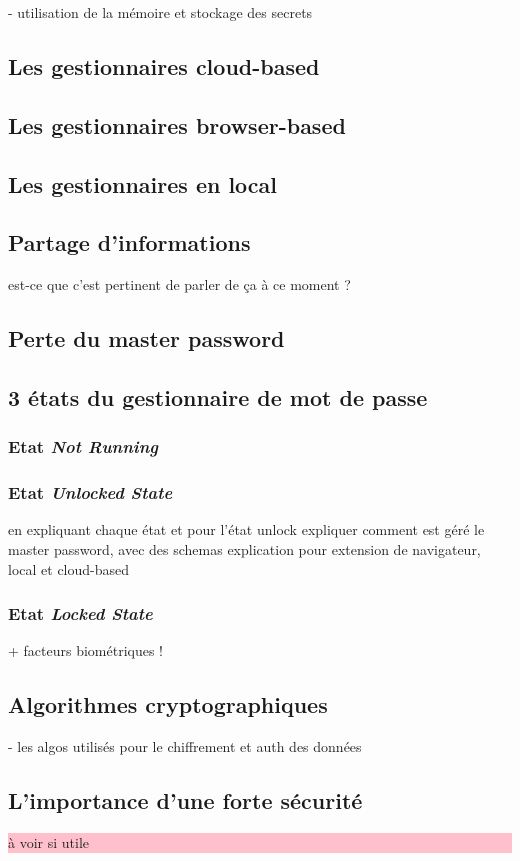 - utilisation de la mémoire et stockage des secrets
\subsection{Les gestionnaires cloud-based}
\subsection{Les gestionnaires browser-based}
\subsection{Les gestionnaires en local}
\subsection{Partage d'informations}
est-ce que c'est pertinent de parler de ça à ce moment ?
\subsection{Perte du master password}
\subsection{3 états du gestionnaire de mot de passe}

\subsubsection{Etat \textit{Not Running}}
\subsubsection{Etat \textit{Unlocked State}}
en expliquant chaque état et pour l'état unlock expliquer comment est géré le master password, avec des schemas
explication pour extension de navigateur, local et cloud-based
\subsubsection{Etat \textit{Locked State}}

+ facteurs biométriques !

\subsection{Algorithmes cryptographiques}
- les algos utilisés pour le chiffrement et auth des données 
\subsection{L'importance d'une forte sécurité}
\colorbox{pink}{\parbox{15cm}{à voir si utile}}
